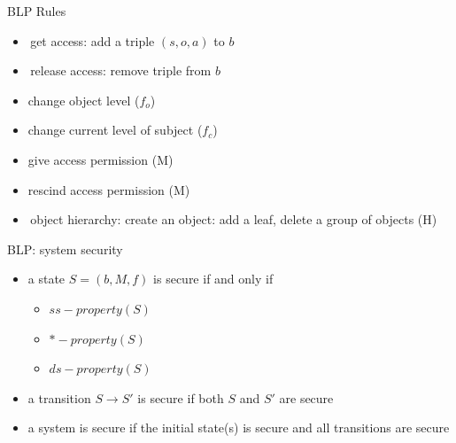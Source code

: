 \documentclass{beamer}
\begin{document}
\begin{frame}{BLP Rules}
  \begin{itemize}
    \item get access: add a triple $(s,o,a)$ to $b$
    \item release access: remove triple from $b$
    \item change object level ($f_o$)
    \item change current level of subject ($f_c$)
    \item give access permission (M) 
    \item rescind access permission (M) 
    \item object hierarchy: create an object: add a leaf,
      delete a group of objects (H)
  \end{itemize}
\end{frame}

\begin{frame}{BLP: system security}
  \begin{itemize}
  \item a state $S=(b,M,f)$ is secure if and only if 
    \begin{itemize}
      \item $ss-property(S)$
      \item $*-property(S)$
      \item $ds-property(S)$
    \end{itemize}
  \item a transition $S \rightarrow S'$ is secure if
    both $S$ and $S'$ are secure
  \item a system is secure if the initial state(s) is secure
    and all transitions are secure
  \end{itemize}
\end{frame}

\end{document}
